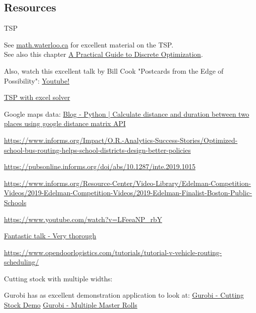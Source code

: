 \subsection{Resources}
TSP
\begin{resource}
See \href{http://www.math.uwaterloo.ca/tsp/index.html}{math.waterloo.ca} for excellent material on the TSP.\\
See also this chapter \href{https://www.math.uwaterloo.ca/~bico/papers/comp_chapter1.pdf}{A Practical Guide to Discrete
Optimization}.

Also, watch this excellent talk by Bill Cook "Postcards from the Edge of Possibility":
\href{https://m.youtube.com/watch?v=5VjphFYQKj8}{Youtube!}

\href{https://www.youtube.com/watch?v=UQYJvSjXE6I}{TSP with excel solver}

Google maps data:
\href{https://www.geeksforgeeks.org/python-calculate-distance-duration-two-places-using-google-distance-matrix-api/}{Blog - Python | Calculate distance and duration between two places using google distance matrix API}
\end{resource}
\begin{resource}
\url{https://www.informs.org/Impact/O.R.-Analytics-Success-Stories/Optimized-school-bus-routing-helps-school-districts-design-better-policies}

\url{https://pubsonline.informs.org/doi/abs/10.1287/inte.2019.1015}

\url{https://www.informs.org/Resource-Center/Video-Library/Edelman-Competition-Videos/2019-Edelman-Competition-Videos/2019-Edelman-Finalist-Boston-Public-Schools}

\url{https://www.youtube.com/watch?v=LFeeaNP_rbY}

\href{https://www.youtube.com/watch?v=BZA_UaX8rs8&t=23s&ab_channel=MERSCognitiveRobotics}{Fantastic talk - Very thorough}

\url{https://www.opendoorlogistics.com/tutorials/tutorial-v-vehicle-routing-scheduling/}
\end{resource}

\begin{resource}
Cutting stock with multiple widths:

Gurobi has as excellent demonstration application to look at:
\href{https://demos.gurobi.com/cutstock/}{Gurobi - Cutting Stock Demo}
\href{https://www.gurobi.com/cutting-stock-problem-with-multiple-master-rolls/}{Gurobi - Multiple Master Rolls}
\end{resource}

